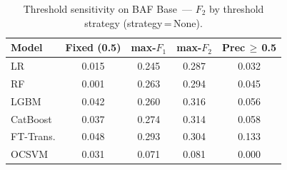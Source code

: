 \begin{table}[ht!]
\centering
\caption{Threshold sensitivity on BAF Base~--- $F_2$ by threshold strategy (strategy\,=\,None).}
\label{tab:threshold_baf_f2}
\begin{tabular}{l c c c c}
\toprule
Model & Fixed (0.5) & max-$F_1$ & max-$F_2$ & Prec\,$\geq$\,0.5 \\
\midrule
LR         & 0.015 & 0.245 & 0.287 & 0.032 \\
RF         & 0.001 & 0.263 & 0.294 & 0.045 \\
LGBM       & 0.042 & 0.260 & 0.316 & 0.056 \\
CatBoost   & 0.037 & 0.274 & 0.314 & 0.058 \\
FT-Trans.  & 0.048 & 0.293 & 0.304 & 0.133 \\
OCSVM      & 0.031 & 0.071 & 0.081 & 0.000 \\
\bottomrule
\end{tabular}
\end{table}
